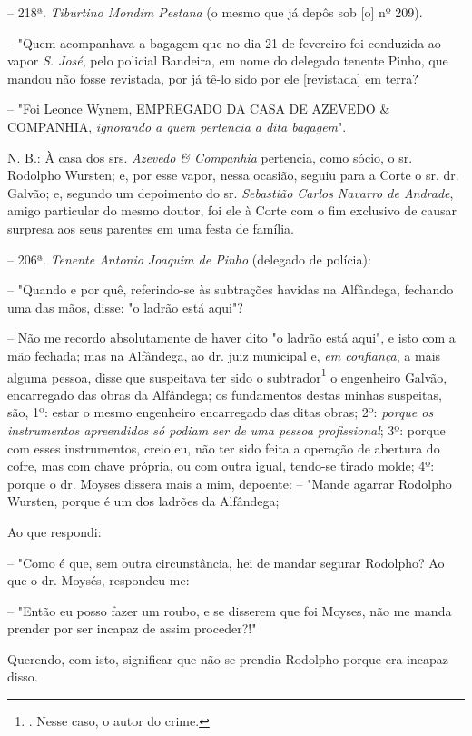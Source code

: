 -- 218ª. \emph{Tiburtino Mondim Pestana} (o mesmo que já depôs sob
{[}o{]} nº 209).

-- "Quem acompanhava a bagagem que no dia 21 de fevereiro foi conduzida
ao vapor \emph{S. José}, pelo policial Bandeira, em nome do delegado
tenente Pinho, que mandou não fosse revistada, por já tê-lo sido por ele
{[}revistada{]} em terra?

-- "Foi Leonce Wynem, EMPREGADO DA CASA DE AZEVEDO \& COMPANHIA,
\emph{ignorando a quem pertencia a dita bagagem}".

N. B.: À casa dos srs. \emph{Azevedo \& Companhia} pertencia, como
sócio, o sr. Rodolpho Wursten; e, por esse vapor, nessa ocasião, seguiu
para a Corte o sr. dr. Galvão; e, segundo um depoimento do sr.
\emph{Sebastião Carlos Navarro de Andrade}, amigo particular do mesmo
doutor, foi ele à Corte com o fim exclusivo de causar surpresa aos seus
parentes em uma festa de família.

-- 206ª. \emph{Tenente Antonio Joaquim de Pinho} (delegado de polícia):

-- "Quando e por quê, referindo-se às subtrações havidas na Alfândega,
fechando uma das mãos, disse: "o ladrão está aqui"?

-- Não me recordo absolutamente de haver dito "o ladrão está aqui", e
isto com a mão fechada; mas na Alfândega, ao dr. juiz municipal e,
\emph{em confiança}, a mais alguma pessoa, disse que suspeitava ter sido
o subtrador\footnote{. Nesse caso, o autor do crime.} o engenheiro
Galvão, encarregado das obras da Alfândega; os fundamentos destas minhas
suspeitas, são, 1º: estar o mesmo engenheiro encarregado das ditas
obras; 2º: \emph{porque os instrumentos apreendidos só podiam ser de uma
pessoa profissional}; 3º: porque com esses instrumentos, creio eu, não
ter sido feita a operação de abertura do cofre, mas com chave própria,
ou com outra igual, tendo-se tirado molde; 4º: porque o dr. Moyses
dissera mais a mim, depoente: -- "Mande agarrar Rodolpho Wursten, porque
é um dos ladrões da Alfândega;

Ao que respondi:

-- "Como é que, sem outra circunstância, hei de mandar segurar Rodolpho?
Ao que o dr. Moysés, respondeu-me:

-- "Então eu posso fazer um roubo, e se disserem que foi Moyses, não me
manda prender por ser incapaz de assim proceder?!"

Querendo, com isto, significar que não se prendia Rodolpho porque era
incapaz disso.

